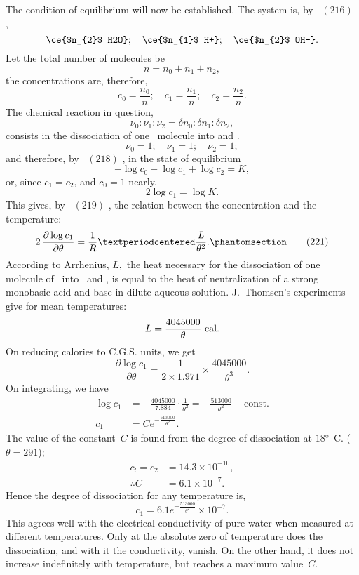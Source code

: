 \documentclass[12pt]{book}[2005/09/16]
\newcommand{\Chg}[2]{#2}
\newcommand{\Add}[1]{\Chg{}{#1}}
\newcommand{\Tag}[1]{%
  \phantomsection\label{eqn:#1}\tag*{\ensuremath{#1}}%
}
\newcommand{\Eq}[1]{%
  \hyperref[eqn:#1]{\ensuremath{#1}}%
}
\newcommand{\PageSep}[1]{\ignorespaces}
\newcommand{\const}{\text{const.}}
\newcommand{\efrac}[2]{\tfrac{#1}{#2}}
\newcommand{\dd}{\partial}
\newcommand{\Unit}[1]{\text{\upshape #1}}
\begin{document}
The condition of equilibrium will now be established.
The system is, by~\Eq{(216)},
\[
\ce{$n_{2}$ H2O};\quad
\ce{$n_{1}$ H+};\quad
\ce{$n_{2}$ OH-}.
\]
Let the total number of molecules be
\[
n = n_{0} + n_{1} + n_{2},
\]
the concentrations are, therefore,
\[
c_{0} = \frac{n_{0}}{n};\quad
c_{1} = \frac{n_{1}}{n};\quad
c_{2} = \frac{n_{2}}{n}.
\]
The chemical reaction in question,
\[
\nu_{0} : \nu_{1} : \nu_{2} = \delta n_{0} : \delta n_{1} : \delta n_{2},
\]
consists in the dissociation of one ~molecule into  and
.
\[
\nu_{0} = 1;\quad
\nu_{1} = 1;\quad
\nu_{2} = 1;
\]
and therefore, by~\Eq{(218)}, in the state of equilibrium
\[
-\log c_{0} + \log c_{1} + \log c_{2} = K,
\]
or, since $c_{1} = c_{2}$, and $c_{0} = 1$ nearly,
\[
2 \log c_{1} = \log K.
\]
This gives, by~\Eq{(219)}, the relation between the concentration
and the temperature:
\[
2\, \frac{\dd \log c_{1}}{\dd \theta} = \frac{1}{R} · \frac{L}{\theta^{2}}.
\Tag{(221)}
\]
According to Arrhenius, $L$,~the heat necessary for the dissociation
%
of one molecule of~ into ~and , is equal to
the heat of neutralization of a strong monobasic acid and
base in dilute aqueous solution. J.~Thomsen's experiments
%
give for mean temperatures:
\[
L = \frac{4045000}{\theta}~\Unit{cal.}
\]
\PageSep{236}
On reducing calories to C.G.S. units, we get
\[
\frac{\dd \log c_{1}}{\dd \theta} = \frac{1}{2 × 1.971} × \frac{4045000}{\theta^{3}}.
\]
On integrating, we have
\begin{align*}
\log c_{1}
  &= -\frac{4045000}{7.884} · \frac{1}{\theta^{2}}
   = -\frac{513000}{\theta^{2}} + \const \\
c_{1} &= C e^{-\efrac{513000}{\theta^{2}}}.
\end{align*}
The value of the constant~$C$ is found from the degree of
dissociation at $18°$~C. ($\theta = 291$);
\begin{align*}
c_{l} = c_{2} &= 14.3 × 10^{-10}\Add{,} \\
\therefore
C &= 6.1 × 10^{-7}\Add{.}
\end{align*}
Hence the degree of dissociation for any temperature is,
\[
c_{1} = 6.1 e^{-\efrac{513000}{\theta^{2}}} × 10^{-7}.
\]
This agrees well with the electrical conductivity of pure
%
%
water when measured at different temperatures. Only at
the absolute zero of temperature does the dissociation, and
with it the conductivity, vanish. On the other hand, it
does not increase indefinitely with temperature, but reaches
a maximum value~$C$.
\end{document}
